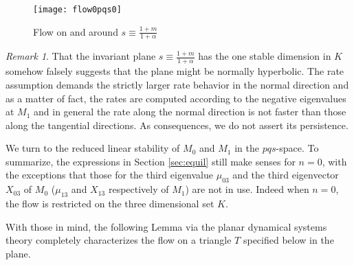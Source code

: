 \documentclass[a4paper,11pt]{article}
\theoremstyle{remark}
\newtheorem{remark}{Remark}[section]
\begin{document}
\begin{figure}[ht] 
 \centering
 \texttt{[image: flow0pqs0]} 
 \caption{Flow on and around $s\equiv\tfrac{1+m}{1+ \alpha}$} \label{fig:n0pqs}
\end{figure}


\begin{remark}
That the invariant plane $s\equiv\tfrac{1+m}{1+ \alpha}$ has the one stable dimension in $K$ somehow falsely suggests that the plane might be normally hyperbolic. The rate assumption demands the strictly larger rate behavior in the normal direction and as a matter of fact, the rates are computed according to the negative eigenvalues at $M_1$ and in general the rate along the normal direction is not faster than those along the tangential directions. As consequences, we do not assert its persistence. 
\end{remark}

We turn to the reduced linear stability of $M_0$ and $M_1$ in the $pqs$-space. To summarize, the expressions in Section \ref{sec:equil} still make senses for $n=0$, with the exceptions that those for the third eigenvalue $\mu_{03}$ and the third eigenvector $X_{03}$ of $M_0$ ($\mu_{13}$ and $X_{13}$ respectively of $M_1$) are not in use. Indeed when $n=0$, the flow is restricted on the three dimensional set $K$. %

With those in mind, the following Lemma via the planar dynamical systems theory completely characterizes the flow on a triangle $T$ specified below in the plane. %
\end{document}
